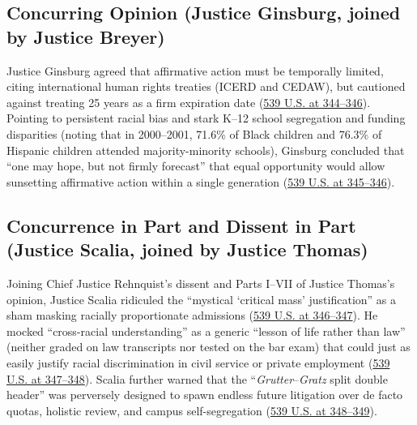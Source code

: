 \documentclass[12pt]{article}
\begin{document}
\subsection{Concurring Opinion (Justice Ginsburg, joined by Justice Breyer)}
Justice Ginsburg agreed that affirmative action must be temporally limited, citing international human rights treaties (ICERD and CEDAW), but cautioned against treating 25 years as a firm expiration date (\href{https://supreme.justia.com/cases/federal/us/539/306/}{539 U.S. at 344--346}). Pointing to persistent racial bias and stark K--12 school segregation and funding disparities (noting that in 2000--2001, 71.6\% of Black children and 76.3\% of Hispanic children attended majority-minority schools), Ginsburg concluded that ``one may hope, but not firmly forecast'' that equal opportunity would allow sunsetting affirmative action within a single generation (\href{https://supreme.justia.com/cases/federal/us/539/306/}{539 U.S. at 345--346}).

\subsection{Concurrence in Part and Dissent in Part (Justice Scalia, joined by Justice Thomas)}
Joining Chief Justice Rehnquist's dissent and Parts I--VII of Justice Thomas's opinion, Justice Scalia ridiculed the ``mystical `critical mass' justification'' as a sham masking racially proportionate admissions (\href{https://supreme.justia.com/cases/federal/us/539/306/}{539 U.S. at 346--347}). He mocked ``cross-racial understanding'' as a generic ``lesson of life rather than law'' (neither graded on law transcripts nor tested on the bar exam) that could just as easily justify racial discrimination in civil service or private employment (\href{https://supreme.justia.com/cases/federal/us/539/306/}{539 U.S. at 347--348}). Scalia further warned that the ``\textit{Grutter}--\textit{Gratz} split double header'' was perversely designed to spawn endless future litigation over de facto quotas, holistic review, and campus self-segregation (\href{https://supreme.justia.com/cases/federal/us/539/306/}{539 U.S. at 348--349}).
\end{document}
